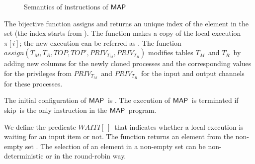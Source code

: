 \documentclass[10pt,a4paper,oneside]{article}
\def\select#1{\ensuremath{pick(#1)}}
\def\fork#1#2{\ensuremath{fork(#1,#2)}}
\def\fassign#1#2#3#4#5#6{\ensuremath{assign(#1,#2,#3,#4,#5,#6)}}
\def\ProgM{\ensuremath{\Prog_{M}}}
\def\TAV{\ensuremath{T_{M}}}
\def\TPV{\ensuremath{T_{R}}}
\def\ST{{\ensuremath{EX}}}
\def\TOP{\ensuremath{TOP}}
\def\chnl{\ensuremath{c}}
\def\NIL{\ensuremath{\bot}}
\def\ACCORCIA{\vspace*{-\baselineskip}}
\def\lcomma{\ensuremath{\!\!:\!\!}}
\def\sanserif#1{\ensuremath{\sf #1}}
\def\MAP{\ensuremath{\sanserif{MAP}}}
\def\Prog{\ensuremath{\pi}}
\def\Progl#1{\ensuremath{\Prog[#1]}}
\def\comm{\ensuremath{\pi}}
\def\commM{\ensuremath{\comm_M}}
\def\LabelRule#1#2#3{\ensuremath{{\inferrule*[Left={#1}]{#2}{#3}}}}
\def\RMAPINIT{MACT}
\def\NSKIP{skip}
\def\iinput#1#2{\textbf{input}~\ensuremath{#1}~\textbf{from}~\ensuremath{#2}}
\def\iskip{\ensuremath{\textbf{\NSKIP}}}
\def\NPRED{\ensuremath{PRED}}
\def\NINIMAP{\ensuremath{WAITI}}
\def\emptyPlace{\ensuremath{[\ ]}}
\def\INIMAPD{\ensuremath{\NINIMAP\emptyPlace}}
\def\PREDE#1{\ensuremath{\NPRED[#1]}}
\def\INIMAPE#1{\ensuremath{\NINIMAP[#1]}}
\def\indexOf#1{\ensuremath{assignIndex(#1)}}
\def\lprog{{\sf prg}}
\def\lprogm{{\sf prg}}
\def\lmemm{{\sf \ensuremath{mem}}}
\def\ltav{\ensuremath{{\sf t_{m}}}}
\def\ltpv{\ensuremath{{\sf t_{r}}}}
\def\ltop{{\sf top}}
\def\LECS{{\sf \ensuremath{LECS}}}
\def\LECSI{\ensuremath{\LECS_{i}}}
\def\litr{{\sf int}}
\def\lmap{{\sf map}}
\def\tcolm{\ensuremath{PRIV_{T_M}}}
\def\tcolr{\ensuremath{PRIV_{T_R}}}
\begin{document}
\begin{figure}[!t]
\begin{center}
\ACCORCIA
\caption{Semantics of instructions of \MAP}
	\label{fig:sem:MAP}
\end{center}
\end{figure}

The bijective function  assigns and returns an unique index of the element  in the set  (the index starts from ). The function  makes a copy of the local execution \Progl{i}; the new execution can be referred as . The function \fassign{\TAV}{\TPV}{\TOP}{\TOP'}{\tcolm}{\tcolr} modifies tables \TAV\ and \TPV\ by adding new columns for the newly cloned processes and the corresponding values for the privileges from \tcolm\ and \tcolr\ for the input and output channels for these processes.

The initial configuration of \MAP\ is . The execution of \MAP\ is terminated if \NSKIP\ is the only instruction in the \MAP\ program.

We define the predicate  \INIMAPD\ that indicates whether a local execution is waiting for an input  item or not. The function  returns an element from the non-empty set . The selection of an element in a non-empty set  can be non-deterministic or in the round-robin way.
\end{document}
